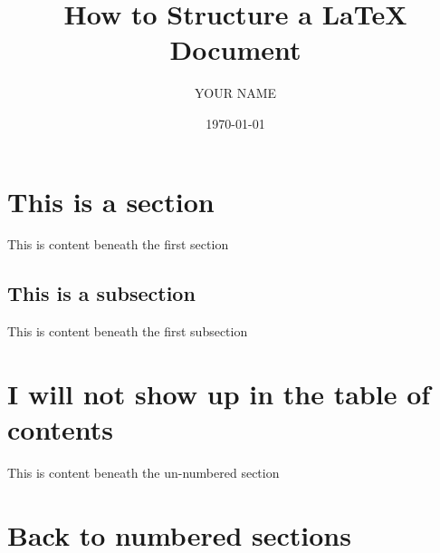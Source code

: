 \documentclass[12pt]{article}
\begin{document}

\pagestyle{empty}

\title{How to Structure a {\LaTeX} Document}
\author{YOUR NAME}
\date{\today}
\maketitle


\section{This is a section}
This is content beneath the first section

\subsection{This is a subsection}
This is content beneath the first subsection

\section*{I will not show up in the table of contents}
This is content beneath the un-numbered section

\section{Back to numbered sections}

\end{document}
